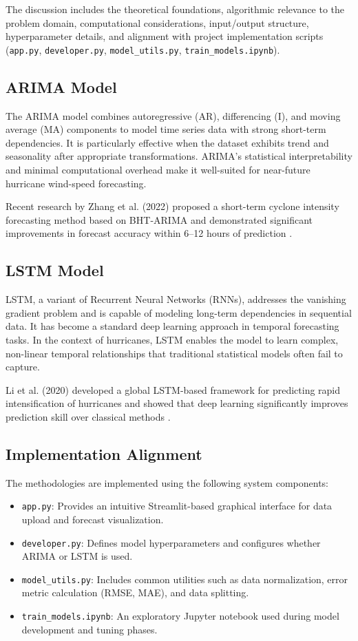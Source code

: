 The discussion includes the theoretical foundations, algorithmic relevance to the problem domain, computational considerations, input/output structure, hyperparameter details, and alignment with project implementation scripts (\texttt{app.py}, \texttt{developer.py}, \texttt{model\_utils.py}, \texttt{train\_models.ipynb}).

\subsection{ARIMA Model}

The ARIMA model combines autoregressive (AR), differencing (I), and moving average (MA) components to model time series data with strong short-term dependencies. It is particularly effective when the dataset exhibits trend and seasonality after appropriate transformations. ARIMA’s statistical interpretability and minimal computational overhead make it well-suited for near-future hurricane wind-speed forecasting.

Recent research by Zhang et al. (2022) proposed a short-term cyclone intensity forecasting method based on BHT-ARIMA and demonstrated significant improvements in forecast accuracy within 6–12 hours of prediction \cite{zhang2022bhtarima}.

\subsection{LSTM Model}

LSTM, a variant of Recurrent Neural Networks (RNNs), addresses the vanishing gradient problem and is capable of modeling long-term dependencies in sequential data. It has become a standard deep learning approach in temporal forecasting tasks. In the context of hurricanes, LSTM enables the model to learn complex, non-linear temporal relationships that traditional statistical models often fail to capture.

Li et al. (2020) developed a global LSTM-based framework for predicting rapid intensification of hurricanes and showed that deep learning significantly improves prediction skill over classical methods \cite{li2020lstmrapid}.

\subsection{Implementation Alignment}

The methodologies are implemented using the following system components:
\begin{itemize}
	\item \texttt{app.py}: Provides an intuitive Streamlit-based graphical interface for data upload and forecast visualization.
	\item \texttt{developer.py}: Defines model hyperparameters and configures whether ARIMA or LSTM is used.
	\item \texttt{model\_utils.py}: Includes common utilities such as data normalization, error metric calculation (RMSE, MAE), and data splitting.
	\item \texttt{train\_models.ipynb}: An exploratory Jupyter notebook used during model development and tuning phases.
\end{itemize}


